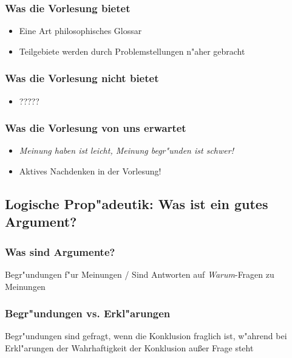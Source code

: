 \documentclass[]{scrartcl}
\begin{document}
\subsubsection{Was die Vorlesung bietet}

\begin{itemize}
  \item Eine Art philosophisches Glossar
  \item Teilgebiete werden durch Problemstellungen n"aher gebracht
\end{itemize}


\subsubsection{Was die Vorlesung nicht bietet}

\begin{itemize}
  \item ?????
\end{itemize}

\subsubsection{Was die Vorlesung von uns erwartet}

\begin{itemize}
  \item \emph{Meinung haben ist leicht, Meinung begr"unden ist schwer!}
  \item Aktives Nachdenken in der Vorlesung!
\end{itemize}

\subsection{Logische Prop"adeutik: Was ist ein gutes Argument?}

\subsubsection{Was sind Argumente?}

Begr"undungen f"ur Meinungen / Sind Antworten auf \emph{Warum}-Fragen zu Meinungen

\subsubsection{Begr"undungen vs. Erkl"arungen}

Begr"undungen sind gefragt, wenn die Konklusion fraglich ist, w"ahrend bei Erkl"arungen der Wahrhaftigkeit der Konklusion außer Frage steht
\end{document}
